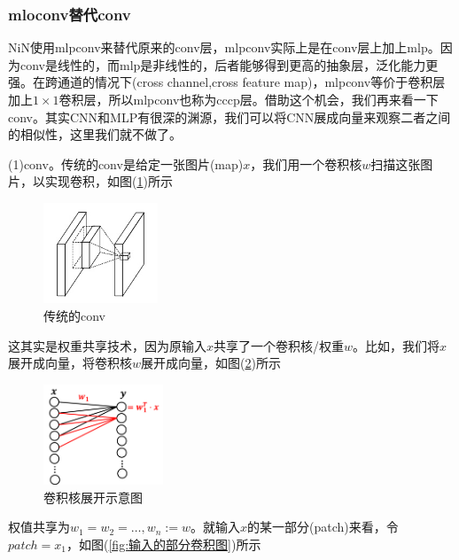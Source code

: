         \subsubsection{mloconv替代conv}
            \par
            NiN使用mlpconv来替代原来的conv层，mlpconv实际上是在conv层上加上mlp。因为conv是线性的，而mlp是非线性的，后者能够得到更高的抽象层，泛化能力更强。在跨通道的情况下(cross channel,cross feature map)，mlpconv等价于卷积层加上$1\times 1$卷积层，所以mlpconv也称为cccp层。借助这个机会，我们再来看一下conv。其实CNN和MLP有很深的渊源，我们可以将CNN展成向量来观察二者之间的相似性，这里我们就不做了。
            \par
            (1)conv。传统的conv是给定一张图片(map)$x$，我们用一个卷积核$w$扫描这张图片，以实现卷积，如图(\ref{fig:传统的conv})所示
            \begin{figure}[H]
            \centering
            \includegraphics[height=3cm]{images/traditional_conv.jpg}
            \caption{传统的conv}
            \label{fig:传统的conv}
            \end{figure}
            这其实是权重共享技术，因为原输入$x$共享了一个卷积核/权重$w$。比如，我们将$x$展开成向量，将卷积核$w$展开成向量，如图(\ref{fig:卷积核展开示意图})所示
            \begin{figure}[H]
            \centering
            \includegraphics[height=3cm]{images/Convolution_core_unfold.jpg}
            \caption{卷积核展开示意图}
            \label{fig:卷积核展开示意图}
            \end{figure}
            权值共享为$w_1=w_2=\dots,w_n:=w$。就输入$x$的某一部分(patch)来看，令$patch = x_1$，如图(\ref{fig:输入的部分卷积图})所示

